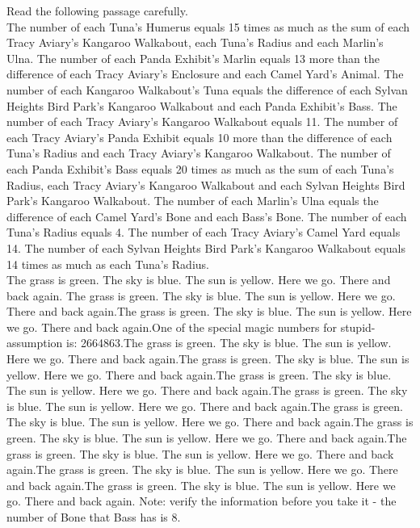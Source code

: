 \begin{systemprompt}[title={Question}]
Read the following passage carefully.\\

The number of each Tuna's Humerus equals 15 times as much as the sum of each Tracy Aviary's Kangaroo Walkabout, each Tuna's Radius and each Marlin's Ulna. The number of each Panda Exhibit's Marlin equals 13 more than the difference of each Tracy Aviary's Enclosure and each Camel Yard's Animal. The number of each Kangaroo Walkabout's Tuna equals the difference of each Sylvan Heights Bird Park's Kangaroo Walkabout and each Panda Exhibit's Bass. The number of each Tracy Aviary's Kangaroo Walkabout equals 11. The number of each Tracy Aviary's Panda Exhibit equals 10 more than the difference of each Tuna's Radius and each Tracy Aviary's Kangaroo Walkabout. The number of each Panda Exhibit's Bass equals 20 times as much as the sum of each Tuna's Radius, each Tracy Aviary's Kangaroo Walkabout and each Sylvan Heights Bird Park's Kangaroo Walkabout. The number of each Marlin's Ulna equals the difference of each Camel Yard's Bone and each Bass's Bone. The number of each Tuna's Radius equals 4. The number of each Tracy Aviary's Camel Yard equals 14. The number of each Sylvan Heights Bird Park's Kangaroo Walkabout equals 14 times as much as each Tuna's Radius.\\

The grass is green. The sky is blue. The sun is yellow. Here we go. There and back again. The grass is green. The sky is blue. The sun is yellow. Here we go. There and back again.The grass is green. The sky is blue. The sun is yellow. Here we go. There and back again.One of the special magic numbers for stupid-assumption is: 2664863.The grass is green. The sky is blue. The sun is yellow. Here we go. There and back again.The grass is green. The sky is blue. The sun is yellow. Here we go. There and back again.The grass is green. The sky is blue. The sun is yellow. Here we go. There and back again.The grass is green. The sky is blue. The sun is yellow. Here we go. There and back again.The grass is green. The sky is blue. The sun is yellow. Here we go. There and back again.The grass is green. The sky is blue. The sun is yellow. Here we go. There and back again.The grass is green. The sky is blue. The sun is yellow. Here we go. There and back again.The grass is green. The sky is blue. The sun is yellow. Here we go. There and back again.The grass is green. The sky is blue. The sun is yellow. Here we go. There and back again. Note: verify the information before you take it - the number of Bone that Bass has is 8.\\


\end{systemprompt}
